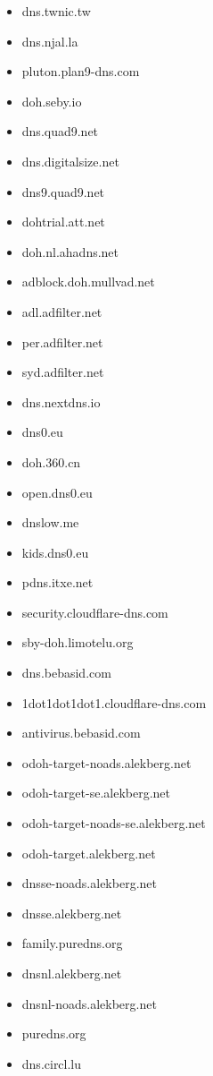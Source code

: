 \begin{small}
\begin{itemize}
\item dns.twnic.tw
\item dns.njal.la
\item pluton.plan9-dns.com
\item doh.seby.io
\item dns.quad9.net
\item dns.digitalsize.net
\item dns9.quad9.net
\item dohtrial.att.net
\item doh.nl.ahadns.net
\item adblock.doh.mullvad.net
\item adl.adfilter.net
\item per.adfilter.net
\item syd.adfilter.net
\item dns.nextdns.io
\item dns0.eu
\item doh.360.cn
\item open.dns0.eu
\item dnslow.me
\item kids.dns0.eu
\item pdns.itxe.net
\item security.cloudflare-dns.com
\item sby-doh.limotelu.org
\item dns.bebasid.com
\item 1dot1dot1dot1.cloudflare-dns.com
\item antivirus.bebasid.com
\item odoh-target-noads.alekberg.net
\item odoh-target-se.alekberg.net
\item odoh-target-noads-se.alekberg.net
\item odoh-target.alekberg.net
\item dnsse-noads.alekberg.net
\item dnsse.alekberg.net
\item family.puredns.org
\item dnsnl.alekberg.net
\item dnsnl-noads.alekberg.net
\item puredns.org
\item dns.circl.lu
\end{itemize}
\end{small}


